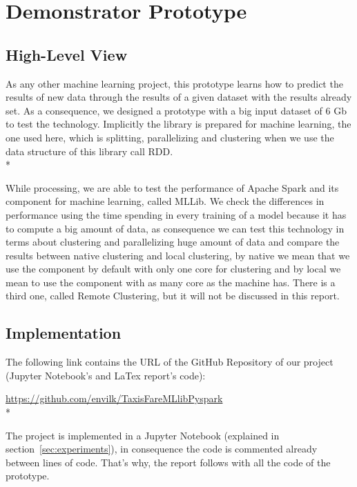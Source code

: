 \section{Demonstrator Prototype}
\label{sec:prototype}
  

\subsection{High-Level View}
As any other machine learning project, this prototype learns how to predict the results of new data through the results of a given dataset with the results already set. As a consequence, we designed a prototype with a big input dataset of 6 Gb to test the technology. Implicitly the library is prepared for machine learning, the one used here, which is splitting, parallelizing and clustering when we use the data structure of this library call RDD.\\*

While processing, we are able to test the performance of Apache Spark and its component for machine learning, called MLLib. 
We check the differences in performance using the time spending in every training of a model because it has to compute a big amount of data, as consequence we can test this technology in terms about clustering and parallelizing huge amount of data and compare the results between native clustering and local clustering, by native we mean that we use the component by default with only one core for clustering and by local we mean to use the component with as many core as the machine has. There is a third one, called Remote Clustering, but it will not be discussed in this report.

\subsection{Implementation}

The following link contains the URL of the GitHub Repository of our project (Jupyter Notebook's and LaTex report's code):
\begin{center}
	\url{https://github.com/envilk/TaxisFareMLlibPyspark}\\*
\end{center}			
						
The project is implemented in a Jupyter Notebook (explained in section~\ref{sec:experiments}), in consequence the code is commented already between lines of code. That's why, the report follows with all the code of the prototype.
		
